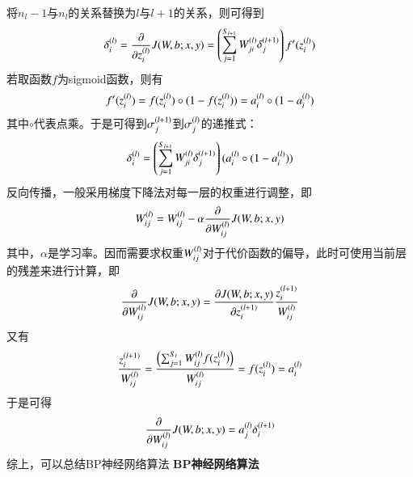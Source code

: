 将$n_l-1$与$n_l$的关系替换为$l$与$l+1$的关系，则可得到
\begin{eqnarray}
\samplet{\delta}{l}{i}=\frac{\partial}{\partial \samplet{z}{l}{i}}J(W,b;x,y)=
\left(
	\begin{aligned}
		\sum_{j=1}^{S_{l+1}}\samplet{W}{l}{ji}\samplet{\delta}{l+1}{j}
	\end{aligned}
\right)
f'(\samplet{z}{l}{i})
\end{eqnarray}
若取函数$f$为sigmoid函数，则有
\begin{eqnarray}
f'(\samplet{z}{l}{i})=f(\samplet{z}{l}{i})\circ(1-f(\samplet{z}{l}{i}))=\samplet{a}{l}{i}\circ(1-\samplet{a}{l}{i})
\end{eqnarray}
其中$\circ$代表点乘。于是可得到$\samplet{\sigma}{l+1}{j}$到$\samplet{\sigma}{l}{j}$的递推式：
\begin{eqnarray}
\samplet{\delta}{l}{i}=
\left(
	\begin{aligned}
		\sum_{j=1}^{S_{l+1}}\samplet{W}{l}{ji}\samplet{\delta}{l+1}{j}
	\end{aligned}
\right)
(\samplet{a}{l}{i}\circ(1-\samplet{a}{l}{i}))
\end{eqnarray}
反向传播，一般采用梯度下降法对每一层的权重进行调整，即
\begin{eqnarray}
\samplet{W}{l}{ij}=\samplet{W}{l}{ij}-\alpha\frac{\partial}{\partial \samplet{W}{l}{ij}}J(W,b;x,y)
\end{eqnarray}
其中，$\alpha$是学习率。因而需要求权重$\samplet{W}{l}{ij}$对于代价函数的偏导，此时可使用当前层的残差来进行计算，即
\begin{eqnarray}
\frac{\partial}{\partial \samplet{W}{l}{ij}}J(W,b;x,y)=\frac{\partial J(W,b;x,y)}{\partial \samplet{z}{l+1}{i}}\frac{\samplet{z}{l+1}{i}}{\samplet{W}{l}{ij}}
\end{eqnarray}
又有
\begin{eqnarray}
\frac{\samplet{z}{l+1}{i}}{\samplet{W}{l}{ij}}=\frac{\left( \sum_{j=1}^{S_l}\samplet{W}{l}{ij}f(\samplet{z}{l}{i}) \right)}{\samplet{W}{l}{ij}}=f(\samplet{z}{l}{i})=\samplet{a}{l}{i}
\end{eqnarray}
于是可得
\begin{eqnarray}
\frac{\partial}{\partial \samplet{W}{l}{ij}}J(W,b;x,y)=\samplet{a}{l}{j}\samplet{\delta}{l+1}{i}
\end{eqnarray}
综上，可以总结BP神经网络算法
\textbf{BP神经网络算法}


